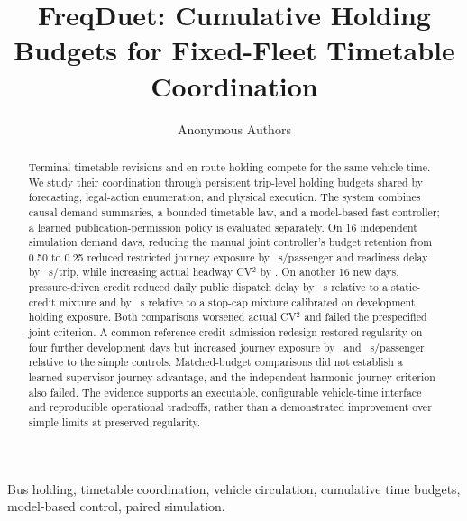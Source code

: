 \documentclass[letterpaper,journal]{IEEEtran}
\begin{document}
\title{FreqDuet: Cumulative Holding Budgets for Fixed-Fleet Timetable Coordination}
\author{Anonymous Authors}
\maketitle
\begin{abstract}
Terminal timetable revisions and en-route holding compete for the same vehicle time. We study their coordination through persistent trip-level holding budgets shared by forecasting, legal-action enumeration, and physical execution. The system combines causal demand summaries, a bounded timetable law, and a model-based fast controller; a learned publication-permission policy is evaluated separately. On 16 independent simulation demand days, reducing the manual joint controller's budget retention from 0.50 to 0.25 reduced restricted journey exposure by \ManualBudgetGain\ s/passenger and readiness delay by \ManualReadinessGain\ s/trip, while increasing actual headway CV$^2$ by \ManualBudgetCV. On another 16 new days, pressure-driven credit reduced daily public dispatch delay by \PressureStaticGain\ s relative to a static-credit mixture and by \PressureCapGain\ s relative to a stop-cap mixture calibrated on development holding exposure. Both comparisons worsened actual CV$^2$ and failed the prespecified joint criterion. A common-reference credit-admission redesign restored regularity on four further development days but increased journey exposure by \JointStaticLoss\ and \JointCapLoss\ s/passenger relative to the simple controls. Matched-budget comparisons did not establish a learned-supervisor journey advantage, and the independent harmonic-journey criterion also failed. The evidence supports an executable, configurable vehicle-time interface and reproducible operational tradeoffs, rather than a demonstrated improvement over simple limits at preserved regularity.
\end{abstract}
\begin{IEEEkeywords}
Bus holding, timetable coordination, vehicle circulation, cumulative time budgets, model-based control, paired simulation.
\end{IEEEkeywords}






\end{document}
